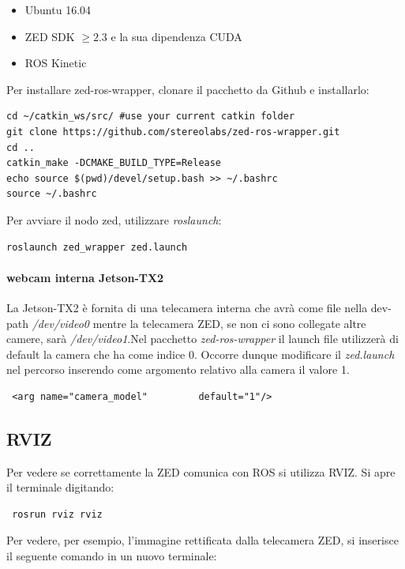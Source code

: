 \documentclass[a4paper]{article}
\begin{document}
\begin{itemize}
\item Ubuntu 16.04
\item ZED SDK $\ge 2.3 $   e la sua dipendenza CUDA
\item ROS Kinetic
\end{itemize}

Per installare zed-ros-wrapper, clonare il pacchetto da Github e installarlo:
\begin{verbatim}
cd ~/catkin_ws/src/ #use your current catkin folder
git clone https://github.com/stereolabs/zed-ros-wrapper.git
cd ..
catkin_make -DCMAKE_BUILD_TYPE=Release
echo source $(pwd)/devel/setup.bash >> ~/.bashrc
source ~/.bashrc
\end{verbatim}

Per avviare il nodo zed, utilizzare \textit{roslaunch}:
\begin{verbatim}
roslaunch zed_wrapper zed.launch
\end{verbatim}

\paragraph{webcam interna Jetson-TX2}
La Jetson-TX2 è fornita di una telecamera interna che avrà come file nella dev-path  \textit{/dev/video0} mentre la telecamera ZED, se non ci sono collegate altre camere, sarà \textit{/dev/video1}.Nel pacchetto \textit{zed-ros-wrapper} il launch file utilizzerà di default la camera che ha come indice 0. Occorre dunque modificare il \textit{zed.launch} nel percorso   inserendo come argomento relativo alla camera il valore 1.
\begin{verbatim}
 <arg name="camera_model"         default="1"/>
\end{verbatim}



\subsection{RVIZ}
Per vedere se correttamente la ZED comunica con ROS si utilizza RVIZ. Si apre il terminale digitando:
\begin{verbatim}
 rosrun rviz rviz
\end{verbatim}
Per vedere, per esempio, l'immagine rettificata dalla telecamera ZED, si inserisce il seguente comando in un nuovo terminale:
\end{document}
